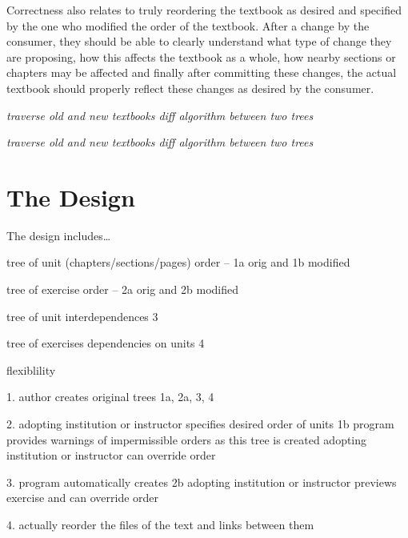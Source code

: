 Correctness also relates to truly reordering the textbook as desired and specified by the one who modified the order of the textbook. After a change by the consumer, they should be able to clearly understand what type of change they are proposing, how this affects the textbook as a whole, how nearby sections or chapters may be affected and finally after committing these changes, the actual textbook should properly reflect these changes as desired by the consumer. 

\textit{traverse old and new textbooks
diff algorithm between two trees}

\textit{traverse old and new textbooks
diff algorithm between two trees}

\cite{bile}
\cite{tsur}
\cite{reactReconcile}

\section{The Design}

The design includes\dots

tree of unit (chapters/sections/pages) order -- 1a orig and 1b modified

tree of exercise order -- 2a orig and 2b modified

tree of unit interdependences 3

tree of exercises dependencies on units 4

flexiblility 

1. author creates original trees 1a, 2a, 3, 4

2. adopting institution or instructor specifies desired order of units 1b \newline
   program provides warnings of impermissible orders as this tree is created \newline
   adopting institution or instructor can override order
   
3. program automatically creates 2b \newline
   adopting institution or instructor previews exercise and can override order
   
4. actually reorder the files of the text and links between them


